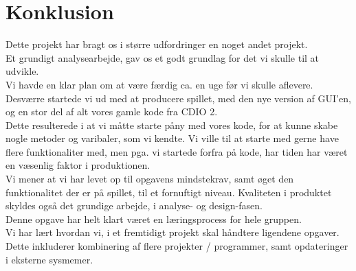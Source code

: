 \chapter{Konklusion}

Dette projekt har bragt os i større udfordringer en noget andet projekt. \\
Et grundigt analysearbejde, gav os et godt grundlag for det vi skulle til at udvikle. \\
Vi havde en klar plan om at være færdig ca. en uge før vi skulle aflevere. \\
Desværre startede vi ud med at producere spillet, med den nye version af GUI'en, og en stor del af alt vores gamle kode fra CDIO 2. \\
Dette resulterede i at vi måtte starte påny med vores kode, for at kunne skabe nogle metoder og varibaler, som vi kendte. Vi ville til at starte med gerne have flere funktionaliter med, men pga. vi startede forfra på kode, har tiden har været en væsenlig faktor i produktionen. \\

\noindent Vi mener at vi har levet op til opgavens mindstekrav, samt øget den funktionalitet der er på spillet, til et fornuftigt niveau. Kvaliteten i produktet skyldes også det grundige arbejde, i analyse- og design-fasen. \\

\noindent Denne opgave har helt klart været en læringsprocess for hele gruppen. \\
Vi har lært hvordan vi, i et fremtidigt projekt skal håndtere ligendene opgaver. Dette inkluderer kombinering af flere projekter / programmer, samt opdateringer i eksterne sysmemer.